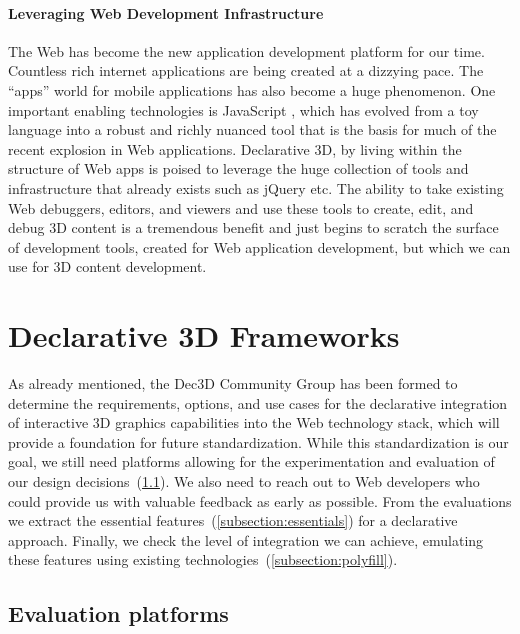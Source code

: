 \documentclass{acmsiggraph}
\begin{document}
\paragraph{Leveraging Web Development Infrastructure}
The Web has become the new application development platform for our time. Countless rich internet applications are being created at a dizzying pace. The ``apps'' world for mobile applications has also become a huge phenomenon. One important enabling technologies is JavaScript \cite{Crockford08}, which has evolved from a toy language into a robust and richly nuanced tool that is the basis for much of the recent explosion in Web applications.
Declarative 3D, by living within the structure of Web apps is poised to leverage the huge collection of tools and infrastructure that already exists such as jQuery \cite{jquery} etc. The ability to take existing Web debuggers, editors, and viewers and use these tools to create, edit, and debug 3D content is a tremendous benefit and just begins to scratch the surface of development tools, created for Web application development, but which we can use for 3D content development.



\section{Declarative 3D Frameworks}
\label{sec:Frameworks}

As already mentioned, the Dec3D Community Group \cite{Dec3D} has been formed to determine the requirements, options, and use cases for the declarative integration of interactive 3D graphics capabilities into the Web technology stack, which will provide a foundation for future standardization. While this standardization is our goal, we still need platforms allowing for the experimentation and evaluation of our design decisions~(\ref{subsection:evaluation}). We also need to reach out to Web developers who could provide us with valuable feedback as early as possible. From the evaluations we extract the essential features~(\ref{subsection:essentials}) for a declarative approach. Finally, we check the level of integration we can achieve, emulating these features using existing technologies~(\ref{subsection:polyfill}).


\subsection{Evaluation platforms}
\label{subsection:evaluation}
\end{document}
